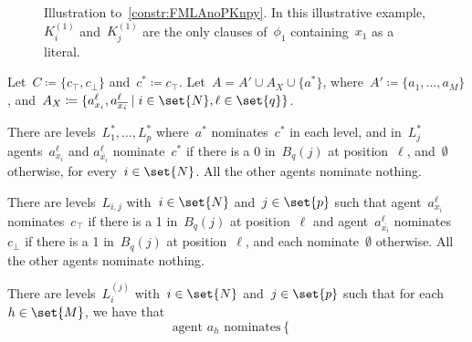 \documentclass[10pt,a4paper,twocolumn]{article}
\theoremstyle{plain}
\theoremstyle{definition}
\theoremstyle{remark}
\newcommand{\ceq}{\coloneqq}
\newcommand{\false}{\bot}
\newcommand{\true}{\top}
\newcommand{\ol}[1]{\overline{#1}}
\newcommand{\lneg}[1]{\ensuremath{\ol{#1}}}
\begin{document}
{{\begin{construction}
\begin{figure}[t!]
    \caption{Illustration to~\cref{constr:FMLAnoPKnpy}. 
    In this illustrative example, 
    $K^{(1)}_i$ and~$K^{(1)}_j$ are the only clauses of~$\phi_1$ containing~$x_1$ as a literal.}
    \label{fig:FMLAnoPKnpy}
    \end{figure}
    Let~$C\ceq\{c_\true,c_\false\}$ and~$c^*\ceq c_\true$.
    Let~$A=A'\cup A_X \cup \{a^*\}$,
    where~$A'\ceq \{a_1,\dots,a_M\}$,
    and~$A_X\ceq \{a_{x_i}^\ell,a_{\lneg{x_i}}^\ell\mid i\in\set{N},\ell\in\set{q}\}$.
    \begin{compactenum}[(i)]
    \item There are levels~$L_1^*,\dots,L_p^*$
    where~$a^*$ nominates~$c^*$ in each level,
    and in~$L_j^*$ 
    agents~$a_{x_i}^\ell$ and $a_{\lneg{x_i}}^\ell$
    nominate~$c^*$ if there is a 0 in~$B_{q}(j)$ at position~$\ell$,
    and~$\emptyset$ otherwise,
    for every~$i\in\set{N}$.
    All the other agents nominate nothing.
    \item There are levels~$L_{i,j}$ with~$i\in\set{N}$ and~$j\in\set{p}$
    such that agent~$a_{x_i}^\ell$ nominates~$c_\true$ if there is a 1 in~$B_{q}(j)$ at position~$\ell$
    and agent~$a_{\lneg{x_i}}^\ell$ nominates~$c_\false$ if there is a 1 in~$B_{q}(j)$ at position~$\ell$,
    and each nominate~$\emptyset$ otherwise.
    All the other agents nominate nothing.
    \item There are levels~$L_{i}^{(j)}$ with~$i\in\set{N}$ and~$j\in\set{p}$ 
    such that for each~$h\in\set{M}$,
    we have that
    \[ \text{agent~$a_h$ nominates} \begin{cases}

\end{cases}\]
\end{compactenum}
\end{construction}}}
\end{document}
